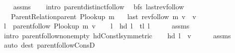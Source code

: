 \begin{isabellebody}
\ \ \isamarkupfalse%
\ assms\isanewline
\ \ \isamarkupfalse%
\ {\isacharparenleft}{\kern0pt}intro\ parent{\isachardot}{\kern0pt}distinct{\isacharunderscore}{\kern0pt}follow{\isacharparenright}{\kern0pt}%
\endisatagproof
{\isafoldproof}%
%
\isadelimproof
\isanewline
%
\endisadelimproof
\isanewline
{}\isamarkupfalse%
\ {\isacharparenleft}{\kern0pt}\ bfs{\isacharparenright}{\kern0pt}\ last{\isacharunderscore}{\kern0pt}rev{\isacharunderscore}{\kern0pt}follow{\isacharcolon}{\kern0pt}\isanewline
\ \ \ {\isachardoublequoteopen}Parent{\isacharunderscore}{\kern0pt}Relation{\isachardot}{\kern0pt}parent\ {\isacharparenleft}{\kern0pt}P{\isacharunderscore}{\kern0pt}lookup\ m{\isacharparenright}{\kern0pt}{\isachardoublequoteclose}\isanewline
\ \ \ {\isachardoublequoteopen}last\ {\isacharparenleft}{\kern0pt}rev{\isacharunderscore}{\kern0pt}follow\ m\ v{\isacharparenright}{\kern0pt}\ {\isacharequal}{\kern0pt}\ v{\isachardoublequoteclose}\isanewline
%
\isadelimproof
%
\endisadelimproof
%
\isatagproof
{}\isamarkupfalse%
\ {\isacharminus}{\kern0pt}\isanewline
\ \ \isamarkupfalse%
\ {\isacharquery}{\kern0pt}l\ {\isacharequal}{\kern0pt}\ {\isachardoublequoteopen}parent{\isachardot}{\kern0pt}follow\ {\isacharparenleft}{\kern0pt}P{\isacharunderscore}{\kern0pt}lookup\ m{\isacharparenright}{\kern0pt}\ v{\isachardoublequoteclose}\isanewline
\ \ \isamarkupfalse%
\ {\isachardoublequoteopen}{\isacharquery}{\kern0pt}l\ {\isacharequal}{\kern0pt}\ hd\ {\isacharquery}{\kern0pt}l\ {\isacharhash}{\kern0pt}\ tl\ {\isacharquery}{\kern0pt}l{\isachardoublequoteclose}\isanewline
\ \ \ \ \isamarkupfalse%
\ assms\isanewline
\ \ \ \ \isamarkupfalse%
\ {\isacharparenleft}{\kern0pt}intro\ parent{\isachardot}{\kern0pt}follow{\isacharunderscore}{\kern0pt}non{\isacharunderscore}{\kern0pt}empty\ hd{\isacharunderscore}{\kern0pt}Cons{\isacharunderscore}{\kern0pt}tl{\isacharbrackleft}{\kern0pt}symmetric{\isacharbrackright}{\kern0pt}{\isacharparenright}{\kern0pt}\isanewline
\ \ \isamarkupfalse%
\ {\isachardoublequoteopen}hd\ {\isacharquery}{\kern0pt}l\ {\isacharequal}{\kern0pt}\ v{\isachardoublequoteclose}\isanewline
\ \ \ \ \isamarkupfalse%
\ assms\isanewline
\ \ \ \ \isamarkupfalse%
\ {\isacharparenleft}{\kern0pt}auto\ dest{\isacharcolon}{\kern0pt}\ parent{\isachardot}{\kern0pt}follow{\isacharunderscore}{\kern0pt}ConsD{\isacharparenright}{\kern0pt}\isanewline
\ \ \isamarkupfalse%

\end{isabellebody}

